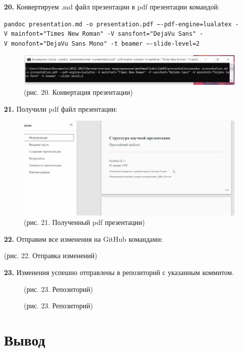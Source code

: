 \documentclass[
  12pt,
  a4paper,
]{scrreprt}
\begin{document}
\textbf{20.} Конвертируем .md файл презентации в pdf презентации
командой:

\texttt{pandoc\ presentation.md\ -o\ presentation.pdf\ —-pdf-engine=lualatex\ -V\ mainfont="Times\ New\ Roman"\ -V\ sansfont="DejaVu\ Sans"\ -V\ monofont="DejaVu\ Sans\ Mono"\ -t\ beamer\ —-slide-level=2}

\begin{figure}
\centering
\includegraphics{./tex2pdf.-cbf55669a78d292a/image/20.PNG}
\caption{(рис. 20. Конвертация презентации)}
\end{figure}

\textbf{21.} Получили pdf файл презентации:

\begin{figure}
\centering
\includegraphics{./tex2pdf.-cbf55669a78d292a/image/21.PNG}
\caption{(рис. 21. Полученный pdf презентации)}
\end{figure}

\textbf{22.} Отправим все изменения на GitHub командами:

{} {} {(рис. 22. Отправка изменений)}

\textbf{23.} Изменения успешно отправлены в репозиторий с указанным
коммитом.

\begin{figure}
\centering
{(рис. 23. Репозиторий)}
\caption{(рис. 23. Репозиторий)}
\end{figure}

\hypertarget{ux432ux44bux432ux43eux434}{%
\chapter{Вывод}\label{ux432ux44bux432ux43eux434}}
\end{document}
